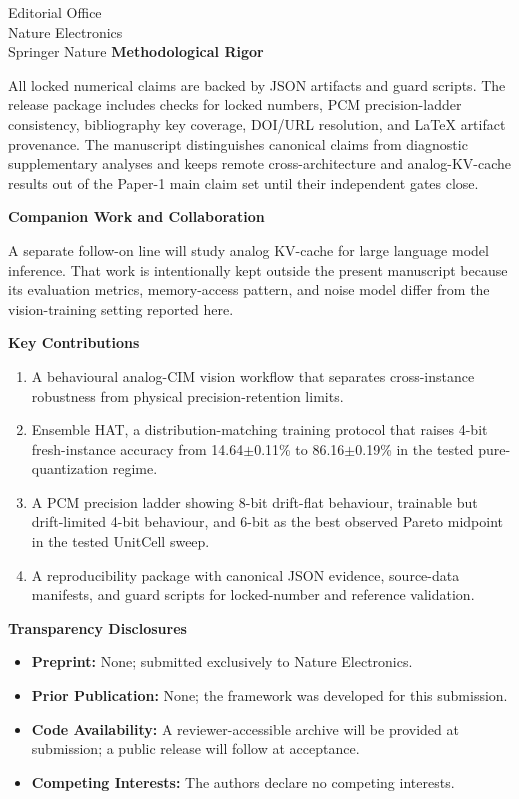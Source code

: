 \documentclass[11pt,a4paper]{letter}
\begin{document}
\begin{letter}{Editorial Office\\Nature Electronics\\Springer Nature}
\vspace{0.5em}
\textbf{Methodological Rigor}

All locked numerical claims are backed by JSON artifacts and guard scripts. The release package includes checks for locked numbers, PCM precision-ladder consistency, bibliography key coverage, DOI/URL resolution, and LaTeX artifact provenance. The manuscript distinguishes canonical claims from diagnostic supplementary analyses and keeps remote cross-architecture and analog-KV-cache results out of the Paper-1 main claim set until their independent gates close.

\vspace{0.5em}
\textbf{Companion Work and Collaboration}

A separate follow-on line will study analog KV-cache for large language model inference. That work is intentionally kept outside the present manuscript because its evaluation metrics, memory-access pattern, and noise model differ from the vision-training setting reported here.

\vspace{0.5em}
\textbf{Key Contributions}

\begin{enumerate}
    \item A behavioural analog-CIM vision workflow that separates cross-instance robustness from physical precision-retention limits.
    \item Ensemble HAT, a distribution-matching training protocol that raises 4-bit fresh-instance accuracy from 14.64$\pm$0.11\% to 86.16$\pm$0.19\% in the tested pure-quantization regime.
    \item A PCM precision ladder showing 8-bit drift-flat behaviour, trainable but drift-limited 4-bit behaviour, and 6-bit as the best observed Pareto midpoint in the tested UnitCell sweep.
    \item A reproducibility package with canonical JSON evidence, source-data manifests, and guard scripts for locked-number and reference validation.
\end{enumerate}

\vspace{0.5em}
\textbf{Transparency Disclosures}

\begin{itemize}
    \item \textbf{Preprint:} None; submitted exclusively to Nature Electronics.
    \item \textbf{Prior Publication:} None; the framework was developed for this submission.
    \item \textbf{Code Availability:} A reviewer-accessible archive will be provided at submission; a public release will follow at acceptance.
    \item \textbf{Competing Interests:} The authors declare no competing interests.
\end{itemize}


\end{letter}
\end{document}
